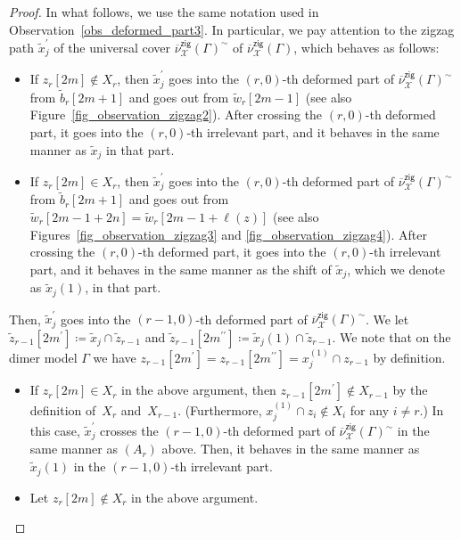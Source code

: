 \documentclass[pdftex]{sigma}%
\numberwithin{equation}{section}
\numberwithin{figure}{section}
\numberwithin{table}{section}
\newcommand{\calX}{\mathcal{X}}
\newcommand{\zig}{\mathsf{zig}}
\begin{document}
\begin{proof}
In what follows, we use the same notation used in Observation~\ref{obs_deformed_part3}.
In particular, we pay attention to the zigzag path $\widetilde{x}_j^\prime$ of the universal cover $\overline{\nu}_\calX^\zig(\Gamma)^\sim$ of $\overline{\nu}_\calX^\zig(\Gamma)$, which behaves as follows:
\begin{itemize}\itemsep=0pt
\item[$(A_r)$] If $z_r[2m]\not\in X_r$, then $\widetilde{x}_j^\prime$ goes into the $(r,0)$-th deformed part of $\overline{\nu}_\calX^\zig(\Gamma)^\sim$ from $\widetilde{b}_r[2m+1]$ and goes out from $\widetilde{w}_r[2m-1]$ (see also Figure~\ref{fig_observation_zigzag2}).
After crossing the $(r,0)$-th deformed part, it goes into the $(r,0)$-th irrelevant part, and it behaves in the same manner as $\widetilde{x}_j$ in that part.
\item[$(B_r)$] If $z_r[2m]\in X_r$, then $\widetilde{x}_j^\prime$ goes into the $(r,0)$-th deformed part of $\overline{\nu}_\calX^\zig(\Gamma)^\sim$ from $\widetilde{b}_r[2m+1]$ and goes out from $\widetilde{w}_r[2m-1+2n]=\widetilde{w}_r[2m-1+\ell(z)]$ (see also Figures~\ref{fig_observation_zigzag3} and \ref{fig_observation_zigzag4}).
After crossing the $(r,0)$-th deformed part, it goes into the $(r,0)$-th irrelevant part, and it behaves in the same manner as the shift of $\widetilde{x}_j$, which we denote as $\widetilde{x}_j(1)$, in that part.
\end{itemize}
Then, $\widetilde{x}_j^\prime$ goes into the $(r-1,0)$-th deformed part of $\overline{\nu}_\calX^\zig(\Gamma)^\sim$.
We let $\widetilde{z}_{r-1}[2m^\prime]\coloneqq \widetilde{x}_j\cap \widetilde{z}_{r-1}$ and $\widetilde{z}_{r-1}[2m^{\prime\prime}]\coloneqq \widetilde{x}_j(1)\cap \widetilde{z}_{r-1}$.
We note that on the dimer model $\Gamma$ we have $z_{r-1}[2m^\prime]=z_{r-1}[2m^{\prime\prime}]=x_j^{(1)}\cap z_{r-1}$ by definition.
\begin{itemize}\itemsep=0pt
\item If $z_r[2m]\in X_r$ in the above argument, then $z_{r-1}[2m^\prime]\not\in X_{r-1}$ by the definition of~$X_r$ and~$X_{r-1}$.
(Furthermore, $x_j^{(1)}\cap z_i\not\in X_i$ for any $i\neq r$.)
In this case, $\widetilde{x}_j^\prime$ crosses the $(r-1,0)$-th deformed part of $\overline{\nu}_\calX^\zig(\Gamma)^\sim$ in the same manner as $(A_r)$ above.
Then, it behaves in the same manner as $\widetilde{x}_j(1)$ in the $(r-1,0)$-th irrelevant part.
\item Let $z_r[2m]\not\in X_r$ in the above argument.
\begin{itemize}\itemsep=0pt

\end{itemize}
\end{itemize}
\end{proof}
\end{document}
